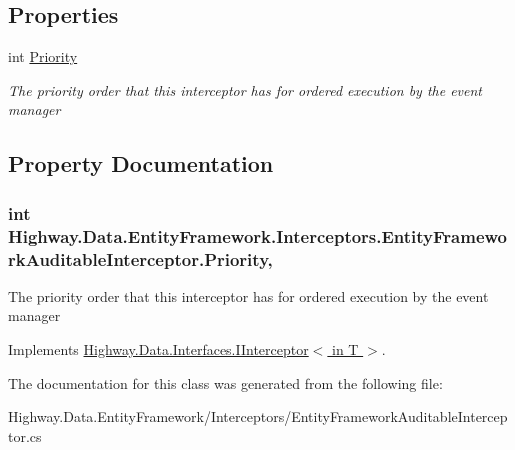 \subsection*{Properties}
\begin{DoxyCompactItemize}
\item 
int \hyperlink{class_highway_1_1_data_1_1_entity_framework_1_1_interceptors_1_1_entity_framework_auditable_interceptor_a49eb8fc89f9eb1b4103f29d4f4c45d6b}{Priority}
\begin{DoxyCompactList}\small\item\em The priority order that this interceptor has for ordered execution by the event manager \end{DoxyCompactList}\end{DoxyCompactItemize}


\subsection{Property Documentation}
\hypertarget{class_highway_1_1_data_1_1_entity_framework_1_1_interceptors_1_1_entity_framework_auditable_interceptor_a49eb8fc89f9eb1b4103f29d4f4c45d6b}{
\subsubsection[{Priority}]{\setlength{\rightskip}{0pt plus 5cm}int Highway.\-Data.\-Entity\-Framework.\-Interceptors.\-Entity\-Framework\-Auditable\-Interceptor.\-Priority\hspace{0.3cm}{\ttfamily [get]}, {\ttfamily [set]}}}\label{class_highway_1_1_data_1_1_entity_framework_1_1_interceptors_1_1_entity_framework_auditable_interceptor_a49eb8fc89f9eb1b4103f29d4f4c45d6b}


The priority order that this interceptor has for ordered execution by the event manager 



Implements \hyperlink{interface_highway_1_1_data_1_1_interfaces_1_1_i_interceptor-g_a7d04e39fcc9ecb1139044cbdda2df23a}{Highway.\-Data.\-Interfaces.\-I\-Interceptor$<$ in T $>$}.



The documentation for this class was generated from the following file\-:\begin{DoxyCompactItemize}
\item 
Highway.\-Data.\-Entity\-Framework/\-Interceptors/Entity\-Framework\-Auditable\-Interceptor.\-cs\end{DoxyCompactItemize}
